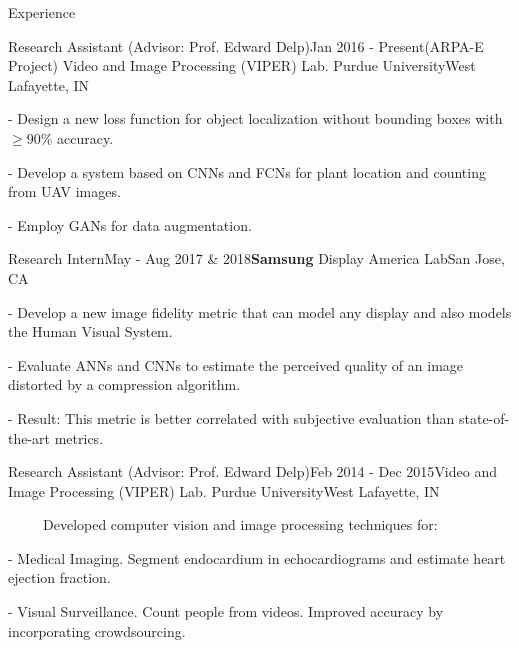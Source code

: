 \documentclass{resume} %
\begin{document}
% 


\begin{rSection}{Experience}

    \begin{rSubsection}{Research Assistant ({\normalfont Advisor}: Prof. Edward Delp)}{Jan 2016 - Present}{(ARPA-E Project) Video and Image Processing (VIPER) Lab. Purdue University}{West Lafayette, IN}
\setlength{\itemindent}{.3in}
\item[-] Design a new loss function for object localization without bounding boxes with $ \ge 90\%$ accuracy.
\item[-] Develop a system based on CNNs and FCNs for plant location and counting from UAV images.
\item[-] Employ GANs for data augmentation.
\end{rSubsection}


\begin{rSubsection}{Research Intern}{May - Aug 2017 \& 2018}{\textbf{Samsung} Display America Lab}{San Jose, CA}
\setlength{\itemindent}{.3in}
\item[-] Develop a new image fidelity metric that can model any display and also models the Human Visual System.
\item[-] Evaluate ANNs and CNNs to estimate the perceived quality of an image distorted by a compression algorithm.
\item[-] Result: This metric is better correlated with subjective evaluation than state-of-the-art metrics.
\end{rSubsection}

    \begin{rSubsection}{Research Assistant ({\normalfont Advisor}: Prof. Edward Delp)}{Feb 2014 - Dec 2015}{Video and Image Processing (VIPER) Lab. Purdue University}{West Lafayette, IN}
\item[]~~~~~Developed computer vision and image processing techniques for:
\setlength{\itemindent}{.3in}
\item[-] Medical Imaging. Segment endocardium in echocardiograms and estimate heart ejection fraction.
\item[-] Visual Surveillance. Count people from videos. Improved accuracy by incorporating crowdsourcing.
\end{rSubsection}

\vspace{-1pt}

\end{rSection}
\end{document}
